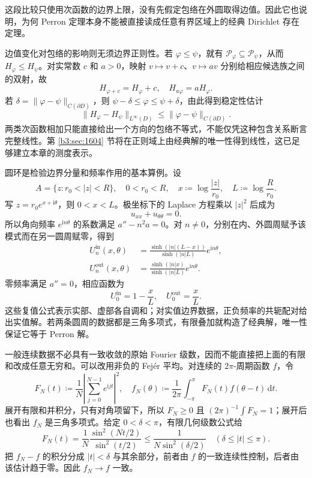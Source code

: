 这段比较只使用次函数的边界上限，没有先假定包络在外圆取得边值。因此它也说明，为何 Perron 定理本身不能被直接读成任意有界区域上的经典 Dirichlet 存在定理。

\ProseParagraphBreak
边值变化对包络的影响则无须边界正则性。若 \(\varphi\le\psi\)，就有 \(\mathcal P_\varphi\subseteq\mathcal P_\psi\)，从而 \(H_\varphi\le H_\psi\)。对实常数 \(c\) 和 \(a>0\)，映射 \(v\mapsto v+c\)、\(v\mapsto av\) 分别给相应候选族之间的双射，故
\[
 H_{\varphi+c}=H_\varphi+c,
 \quad H_{a\varphi}=aH_\varphi.
\]
若 \(\delta=\|\varphi-\psi\|_{C(\partial D)}\)，则 \(\psi-\delta\le\varphi\le\psi+\delta\)，由此得到稳定性估计
\begin{equation}\label{b3:eq:16-perron-stability}
 \|H_\varphi-H_\psi\|_{L^\infty(D)}
 \le\|\varphi-\psi\|_{C(\partial D)}.
\end{equation}
两类次函数相加只能直接给出一个方向的包络不等式，不能仅凭这种包含关系断言完整线性。第 \ref{b3:sec:1604} 节将在正则域上由经典解的唯一性得到线性，这已足够建立本章的测度表示。

\ProseParagraphBreak
圆环是检验边界分量和频率作用的基本算例。设
\[
 A=\{z:r_0<|z|<R\},\quad 0<r_0<R,
 \quad x\coloneqq\log\frac{|z|}{r_0},\quad
 L\coloneqq\log\frac R{r_0}.
\]
写 \(z=r_0e^{x+\mathrm i\theta}\)，则 \(0<x<L\)。极坐标下的 Laplace 方程乘以 \(|z|^2\) 后成为
\[
 u_{xx}+u_{\theta\theta}=0.
\]
所以角向频率 \(e^{\mathrm in\theta}\) 的系数满足 \(a''-n^2a=0\)。对 \(n\ne0\)，分别在内、外圆周赋予该模式而在另一圆周赋零，得到
\begin{equation}\label{b3:eq:16-annulus-modes}
 \begin{aligned}
 U_n^{\mathrm{in}}(x,\theta)
 &=\frac{\sinh(|n|(L-x))}{\sinh(|n|L)}e^{\mathrm in\theta},\\
 U_n^{\mathrm{out}}(x,\theta)
 &=\frac{\sinh(|n|x)}{\sinh(|n|L)}e^{\mathrm in\theta}.
 \end{aligned}
\end{equation}
零频率满足 \(a''=0\)，相应函数为
\[
 U_0^{\mathrm{in}}=1-\frac{x}{L},
 \quad U_0^{\mathrm{out}}=\frac{x}{L}.
\]
这些复值公式表示实部、虚部各自调和；对实值边界数据，正负频率的共轭配对给出实值解。若两条圆周的数据都是三角多项式，有限叠加就构造了经典解，唯一性保证它等于 Perron 解。

\ProseParagraphBreak
一般连续数据不必具有一致收敛的原始 Fourier 级数，因而不能直接把上面的有限和改成任意无穷和。可以改用非负的 Fej\'er 平均。对连续的 \(2\pi\)-周期函数 \(f\)，令
\[
 F_N(t)\coloneqq\frac1N\left|\sum_{j=0}^{N-1}e^{\mathrm ijt}\right|^2,
 \quad
 f_N(\theta)\coloneqq\frac1{2\pi}\int_{-\pi}^{\pi}
 F_N(t)f(\theta-t)\,\mathrm dt.
\]
展开有限和并积分，只有对角项留下，所以 \(F_N\ge0\) 且 \((2\pi)^{-1}\int F_N=1\)；展开后也看出 \(f_N\) 是三角多项式。给定 \(0<\delta<\pi\)，有限几何级数公式给
\[
 F_N(t)=\frac1N\frac{\sin^2(Nt/2)}{\sin^2(t/2)}
 \le\frac{1}{N\sin^2(\delta/2)}
 \quad(\delta\le|t|\le\pi).
\]
把 \(f_N-f\) 的积分分成 \(|t|<\delta\) 与其余部分，前者由 \(f\) 的一致连续性控制，后者由该估计趋于零。因此 \(f_N\to f\) 一致。


